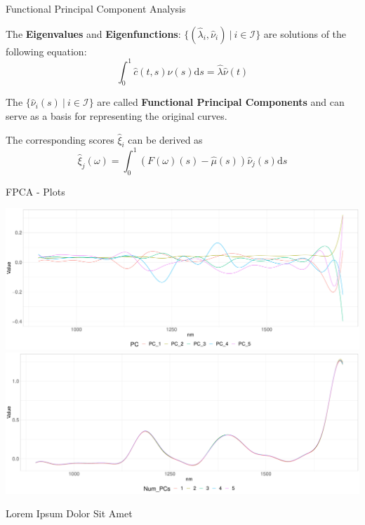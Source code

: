 \documentclass{beamer}
\begin{document}
	\begin{frame}{Functional Principal Component Analysis}
	
		The \textbf{Eigenvalues} and \textbf{Eigenfunctions}: $\{(\hat{\lambda}_i, \hat{\nu}_i) \: \vert \: i \in \mathcal{I}\}$  are solutions of the following equation:
		$$ \int_{0}^{1}\hat{c}(t,s)\hat{\nu}(s) \mathrm{d}s = \hat{\lambda} \hat{\nu}(t) $$
		\vspace{0.2cm}
		
		The $\{\hat{\nu}_i(s) \: \vert \: i \in \mathcal{I}\}$ are called \textbf{Functional Principal Components} and can serve as a basis for representing the original curves. 
		\vspace{0.2cm}
		
		The corresponding scores $\hat{\xi}_i$ can be derived as
		$$\hat{\xi}_j(\omega) = \int_{0}^{1} (F(\omega)(s) - \hat{\mu}(s)) \hat{\nu}_j(s) \mathrm{d}s$$
		
	\end{frame}

	\begin{frame}{FPCA - Plots}
		\begin{minipage}[t]{0.79\textwidth}
			\includegraphics[width = \textwidth]{../Graphics/principal_components.pdf}
			\includegraphics[width = \textwidth]{../Graphics/pc_approx.pdf}
		\end{minipage}
		\begin{minipage}[t]{0.19\textwidth}
			Lorem Ipsum Dolor Sit Amet
		\end{minipage}
	\end{frame}
	
\end{document}
